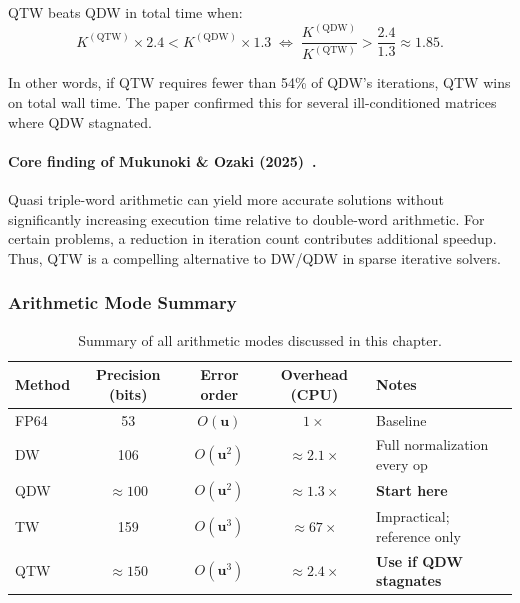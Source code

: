\documentclass[12pt,a4paper]{article}
\newcommand{\uu}{\mathbf{u}}
\begin{document}
QTW beats QDW in total time when:
\begin{equation}
  K^{(\mathrm{QTW})} \times 2.4 < K^{(\mathrm{QDW})} \times 1.3
  \;\Longleftrightarrow\;
  \frac{K^{(\mathrm{QDW})}}{K^{(\mathrm{QTW})}} > \frac{2.4}{1.3} \approx 1.85.
\end{equation}

In other words, if QTW requires fewer than 54\% of QDW's iterations, QTW wins on
total wall time. The paper confirmed this for several ill-conditioned matrices
where QDW stagnated.

\paragraph{Core finding of Mukunoki \& Ozaki (2025)~\cite{Mukunoki2025}.}
Quasi triple-word arithmetic can yield more accurate solutions without
significantly increasing execution time relative to double-word arithmetic.
For certain problems, a reduction in iteration count contributes additional
speedup. Thus, QTW is a compelling alternative to DW/QDW in sparse iterative
solvers.

\subsubsection{Arithmetic Mode Summary}

\begin{table}[H]
\centering
\caption{Summary of all arithmetic modes discussed in this chapter.}
\begin{tabular}{lcccl}
\toprule
\textbf{Method} & \textbf{Precision (bits)} & \textbf{Error order}
               & \textbf{Overhead (CPU)} & \textbf{Notes} \\
\midrule
FP64  & 53            & $O(\uu)$    & $1\times$            & Baseline \\
DW    & 106           & $O(\uu^2)$  & $\approx 2.1\times$  & Full normalization every op \\
QDW   & $\approx 100$ & $O(\uu^2)$  & $\approx 1.3\times$  & \textbf{Start here} \\
TW    & 159           & $O(\uu^3)$  & $\approx 67\times$   & Impractical; reference only \\
QTW   & $\approx 150$ & $O(\uu^3)$  & $\approx 2.4\times$  & \textbf{Use if QDW stagnates} \\
\bottomrule
\end{tabular}
\end{table}


\end{document}

